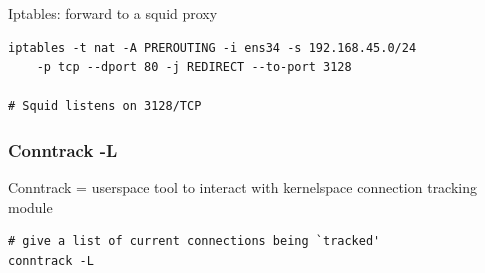 \documentclass{article}
\begin{document}
Iptables: forward to a squid proxy

\begin{verbatim}
iptables -t nat -A PREROUTING -i ens34 -s 192.168.45.0/24 
    -p tcp --dport 80 -j REDIRECT --to-port 3128

# Squid listens on 3128/TCP
\end{verbatim}

\subsubsection{Conntrack -L}

Conntrack = userspace tool to interact with kernelspace connection tracking module

\begin{verbatim}
# give a list of current connections being `tracked'
conntrack -L
\end{verbatim}
\end{document}
